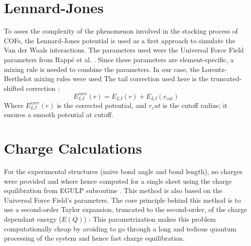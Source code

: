 \section{Lennard-Jones}
To asses the complexity of the phenomenon involved in the stacking process of COFs, the Lennard-Jones potential is used as a first approach to simulate the Van der Waals interactions. The parameters used were the Universal Force Field parameters from Rapp\'e et al. \cite{rappe_uff_1992}. Since these parameters are element-specific, a mixing rule is needed to combine the parameters. In our case, the Lorentz-Berthelot mixing rules were used\cite{lorentz_ueber_1881}%
The tail correction used here is the truncated-shifted correction :
$$E_{LJ}^{corr}(r)=E_{LJ}(r)+E_{LJ}(r_{cut})$$
Where $E_{LJ}^{corr}(r)$ is the corrected potential, and $r_cut$ is the cutoff radius; it ensures a smooth potential at cutoff.

\section{Charge Calculations}
\label{sec:charge}
For the experimental structures (naive bond angle and bond length), no charges were provided and where hence computed for a single sheet using the charge equilibration from EGULP subroutine \cite{kadantsev_fast_2013}. This method is also based on the Universal Force Field's parameters. The core principle behind this method is to use a second-order Taylor expansion, truncated to the second-order, of the charge dependant energy ($E(Q)$)\cite{rappe_charge_1991} :
This parametrization makes this problem computationally cheap by avoiding to go through a long and tedious quantum processing of the system and hence fast charge equilibration.

